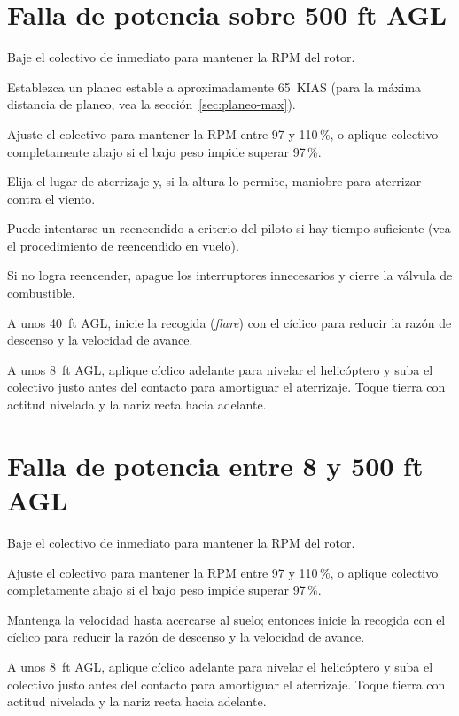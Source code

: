 \section{Falla de potencia sobre 500 ft AGL}

\begin{pasos}
\item Baje el colectivo de inmediato para mantener la RPM del rotor.
\item Establezca un planeo estable a aproximadamente 65~KIAS (para la máxima distancia de planeo, vea la sección~\ref{sec:planeo-max}).
\item Ajuste el colectivo para mantener la RPM entre 97 y 110\,\%, o aplique colectivo completamente abajo si el bajo peso impide superar 97\,\%.
\item Elija el lugar de aterrizaje y, si la altura lo permite, maniobre para aterrizar contra el viento.
\item Puede intentarse un reencendido a criterio del piloto si hay tiempo suficiente (vea el procedimiento de reencendido en vuelo).
\item Si no logra reencender, apague los interruptores innecesarios y cierre la válvula de combustible.
\item A unos 40~ft AGL, inicie la recogida (\emph{flare}) con el cíclico para reducir la razón de descenso y la velocidad de avance.
\item A unos 8~ft AGL, aplique cíclico adelante para nivelar el helicóptero y suba el colectivo justo antes del contacto para amortiguar el aterrizaje. Toque tierra con actitud nivelada y la nariz recta hacia adelante.
\end{pasos}

\section{Falla de potencia entre 8 y 500 ft AGL}

\begin{pasos}
\item Baje el colectivo de inmediato para mantener la RPM del rotor.
\item Ajuste el colectivo para mantener la RPM entre 97 y 110\,\%, o aplique colectivo completamente abajo si el bajo peso impide superar 97\,\%.
\item Mantenga la velocidad hasta acercarse al suelo; entonces inicie la recogida con el cíclico para reducir la razón de descenso y la velocidad de avance.
\item A unos 8~ft AGL, aplique cíclico adelante para nivelar el helicóptero y suba el colectivo justo antes del contacto para amortiguar el aterrizaje. Toque tierra con actitud nivelada y la nariz recta hacia adelante.
\end{pasos}

